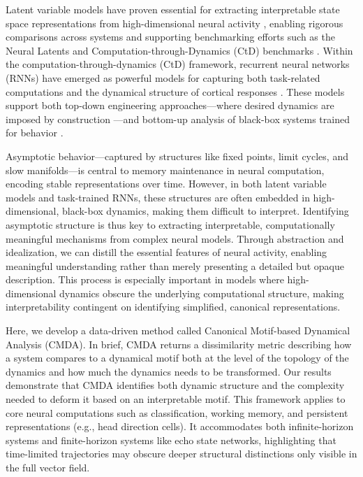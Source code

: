 \documentclass{article}
\theoremstyle{definition} \newtheorem{definition}{Definition}  \newtheorem{example}{Example}
\theoremstyle{remark} \newtheorem{remark}{Remark}
\newcounter{ct}
\begin{document}
Latent variable models have proven essential for extracting interpretable state space representations from high-dimensional neural activity \citep{zoltowski2020general, Dowling2024b, pei2neural}, enabling rigorous comparisons across systems \citep{libedinsky2023comparing} and supporting benchmarking efforts such as the Neural Latents and Computation-through-Dynamics (CtD) benchmarks \citep{pei2neural, versteeg2025computation}.
Within the computation-through-dynamics (CtD) framework, recurrent neural networks (RNNs) have emerged as powerful models for capturing both task-related computations \citep{yang2019task, yang2019multiple, yang2020artificial, sani2021nonlinearity} and the dynamical structure of cortical responses \citep{chaisangmongkon2017transience, mante2013context}.
These models support both top-down engineering approaches—where desired dynamics are imposed by construction \citep{eliasmith2003neuralengineering, eliasmith2005unified, eliasmith2010describe, pollock2020engineering, beiran2023rnns}—and bottom-up analysis of black-box systems trained for behavior \citep{sussillo2013blackbox, maheswaranathan2019reverse, golub2018fixedpointfinder, smith2021reverse, maheswaranathan2019universality, jarne2023initialization, nayebi2021heterogeneity, turner2021charting, turner2023simplicity, zhong2023mechanistic, huang2024measuring}.

Asymptotic behavior—captured by structures like fixed points, limit cycles, and slow manifolds—is central to memory maintenance in neural computation, encoding stable representations over time. However, in both latent variable models and task-trained RNNs, these structures are often embedded in high-dimensional, black-box dynamics, making them difficult to interpret.
Identifying asymptotic structure is thus key to extracting interpretable, computationally meaningful mechanisms from complex neural models.
Through abstraction and idealization, we can distill the essential features of neural activity, enabling meaningful understanding rather than merely presenting a detailed but opaque description. This process is especially important in models where high-dimensional dynamics obscure the underlying computational structure, making interpretability contingent on identifying simplified, canonical representations. 

 
Here, we develop a data-driven method called Canonical Motif-based Dynamical Analysis (CMDA). 
In brief, CMDA returns a dissimilarity metric describing how a system compares to a dynamical motif both at the level of the topology of the dynamics and how much the dynamics needs to be transformed.
Our results demonstrate that CMDA identifies both dynamic structure and the complexity needed to deform it based on an interpretable motif.
This framework applies to core neural computations such as classification, working memory, and persistent representations (e.g., head direction cells).
It accommodates both infinite-horizon systems and finite-horizon systems like echo state networks, highlighting that time-limited trajectories may obscure deeper structural distinctions only visible in the full vector field.
\end{document}
